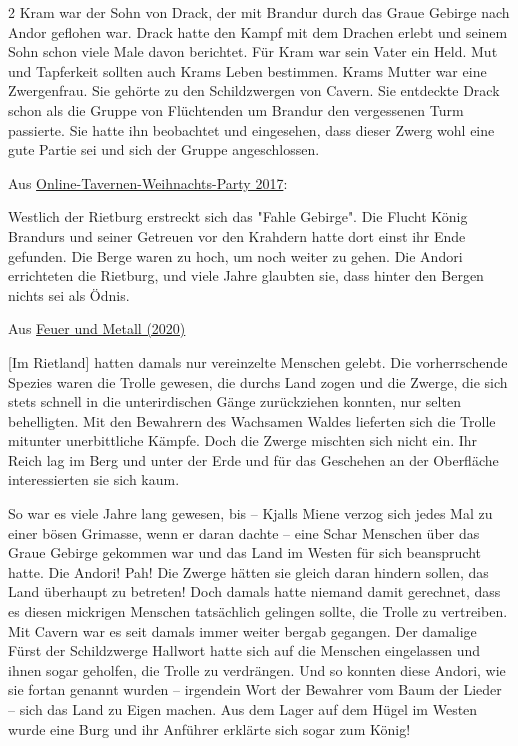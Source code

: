 \documentclass[10pt, a4paper, oneside]{book}
\begin{document}
\begin{multicols}{2}
Kram war der Sohn von Drack, der mit Brandur durch das Graue Gebirge nach Andor geflohen war. Drack hatte den Kampf mit dem Drachen erlebt und seinem Sohn schon viele Male davon berichtet. Für Kram war sein Vater ein Held. Mut und Tapferkeit sollten auch Krams Leben bestimmen. Krams Mutter war eine Zwergenfrau. Sie gehörte zu den Schildzwergen von Cavern. Sie entdeckte Drack schon als die Gruppe von Flüchtenden um Brandur den vergessenen Turm passierte. Sie hatte ihn beobachtet und eingesehen, dass dieser Zwerg wohl eine gute Partie sei und sich der Gruppe angeschlossen.

\begin{center}
    Aus \hyperref[storytext-online-tavernen-weihnachts-party-2017]{Online-Tavernen-Weihnachts-Party 2017}:
\end{center}

Westlich der Rietburg erstreckt sich das "Fahle Gebirge". Die Flucht König Brandurs und seiner Getreuen vor den Krahdern hatte dort einst ihr Ende gefunden. Die Berge waren zu hoch, um noch weiter zu gehen. Die Andori errichteten die Rietburg, und viele Jahre glaubten sie, dass hinter den Bergen nichts sei als Ödnis.

\begin{center}
    Aus \hyperref[storytext-2020-feuer-und-metall]{Feuer und Metall (2020)}
\end{center}

[Im Rietland] hatten damals nur vereinzelte Menschen gelebt. Die vorherrschende Spezies waren die Trolle gewesen, die durchs Land zogen und die Zwerge, die sich stets schnell in die unterirdischen Gänge zurückziehen konnten, nur selten behelligten. Mit den Bewahrern des Wachsamen Waldes lieferten sich die Trolle mitunter unerbittliche Kämpfe. Doch die Zwerge mischten sich nicht ein. Ihr Reich lag im Berg und unter der Erde und für das Geschehen an der Oberfläche interessierten sie sich kaum.\bigskip

So war es viele Jahre lang gewesen, bis – Kjalls Miene verzog sich jedes Mal zu einer bösen Grimasse, wenn er daran dachte – eine Schar Menschen über das Graue Gebirge gekommen war und das Land im Westen für sich beansprucht hatte. Die Andori! Pah! Die Zwerge hätten sie gleich daran hindern sollen, das Land überhaupt zu betreten! Doch damals hatte niemand damit gerechnet, dass es diesen mickrigen Menschen tatsächlich gelingen sollte, die Trolle zu vertreiben. Mit Cavern war es seit damals immer weiter bergab gegangen. Der damalige Fürst der Schildzwerge Hallwort hatte sich auf die Menschen eingelassen und ihnen sogar geholfen, die Trolle zu verdrängen. Und so konnten diese Andori, wie sie fortan genannt wurden – irgendein Wort der Bewahrer vom Baum der Lieder – sich das Land zu Eigen machen. Aus dem Lager auf dem Hügel im Westen wurde eine Burg und ihr Anführer erklärte sich sogar zum König!\bigskip


\end{multicols}
\end{document}
